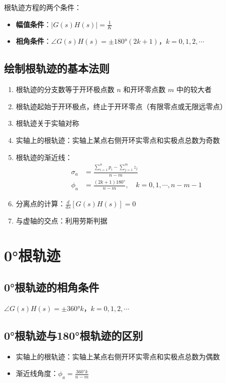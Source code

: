 \documentclass[12pt,a4paper]{article}
\begin{document}
根轨迹方程的两个条件：
\begin{itemize}
    \item \textbf{幅值条件}：$|G(s)H(s)| = \frac{1}{K}$
    \item \textbf{相角条件}：$\angle G(s)H(s) = \pm 180°(2k+1)$，$k = 0, 1, 2, \cdots$
\end{itemize}

\subsection{绘制根轨迹的基本法则}
\begin{enumerate}
    \item 根轨迹的分支数等于开环极点数 $n$ 和开环零点数 $m$ 中的较大者
    \item 根轨迹起始于开环极点，终止于开环零点（有限零点或无限远零点）
    \item 根轨迹关于实轴对称
    \item 实轴上的根轨迹：实轴上某点右侧开环实零点和实极点总数为奇数
    \item 根轨迹的渐近线：
    \begin{align}
    \sigma_a &= \frac{\sum_{i=1}^n p_i - \sum_{j=1}^m z_j}{n-m} \\
    \phi_a &= \frac{(2k+1)180°}{n-m}, \quad k = 0, 1, \cdots, n-m-1
    \end{align}
    \item 分离点的计算：$\frac{d}{ds}[G(s)H(s)] = 0$
    \item 与虚轴的交点：利用劳斯判据
\end{enumerate}

\section{0°根轨迹}

\subsection{0°根轨迹的相角条件}
$\angle G(s)H(s) = \pm 360°k$，$k = 0, 1, 2, \cdots$

\subsection{0°根轨迹与180°根轨迹的区别}
\begin{itemize}
    \item 实轴上的根轨迹：实轴上某点右侧开环实零点和实极点总数为偶数
    \item 渐近线角度：$\phi_a = \frac{360°k}{n-m}$
\end{itemize}
\end{document}
